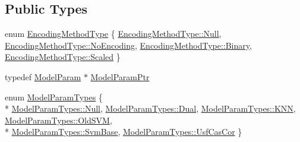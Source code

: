 \subsection*{Public Types}
\begin{DoxyCompactItemize}
\item 
enum \hyperlink{class_k_k_m_l_l_1_1_model_param_a09e49f936f411dba6f08bdaf8d6b4a98}{Encoding\+Method\+Type} \{ \hyperlink{class_k_k_m_l_l_1_1_model_param_a09e49f936f411dba6f08bdaf8d6b4a98abbb93ef26e3c101ff11cdd21cab08a94}{Encoding\+Method\+Type\+::\+Null}, 
\hyperlink{class_k_k_m_l_l_1_1_model_param_a09e49f936f411dba6f08bdaf8d6b4a98a3f6e102acead54bbbf4c704dd88fb94b}{Encoding\+Method\+Type\+::\+No\+Encoding}, 
\hyperlink{class_k_k_m_l_l_1_1_model_param_a09e49f936f411dba6f08bdaf8d6b4a98a6ce976e8f061b2b5cfe4d0c50c3405dd}{Encoding\+Method\+Type\+::\+Binary}, 
\hyperlink{class_k_k_m_l_l_1_1_model_param_a09e49f936f411dba6f08bdaf8d6b4a98a7380ae6c5e1189eef50cfd0557d74e99}{Encoding\+Method\+Type\+::\+Scaled}
 \}
\item 
typedef \hyperlink{class_k_k_m_l_l_1_1_model_param}{Model\+Param} $\ast$ \hyperlink{class_k_k_m_l_l_1_1_model_param_a9207769b1dd342da66939ceffa4324cf}{Model\+Param\+Ptr}
\item 
enum \hyperlink{class_k_k_m_l_l_1_1_model_param_a5984a5fe225fdbe8e40fb5ec746a42d0}{Model\+Param\+Types} \{ \\*
\hyperlink{class_k_k_m_l_l_1_1_model_param_a5984a5fe225fdbe8e40fb5ec746a42d0abbb93ef26e3c101ff11cdd21cab08a94}{Model\+Param\+Types\+::\+Null}, 
\hyperlink{class_k_k_m_l_l_1_1_model_param_a5984a5fe225fdbe8e40fb5ec746a42d0acf53591af1208ddd535806600273099a}{Model\+Param\+Types\+::\+Dual}, 
\hyperlink{class_k_k_m_l_l_1_1_model_param_a5984a5fe225fdbe8e40fb5ec746a42d0ab602e23c0ec2466f3aa6cade0cd5ce05}{Model\+Param\+Types\+::\+K\+NN}, 
\hyperlink{class_k_k_m_l_l_1_1_model_param_a5984a5fe225fdbe8e40fb5ec746a42d0a7a3ee72cc2709227d58fd2c189a2a58b}{Model\+Param\+Types\+::\+Old\+S\+VM}, 
\\*
\hyperlink{class_k_k_m_l_l_1_1_model_param_a5984a5fe225fdbe8e40fb5ec746a42d0ac59ef2743d310cad5d7bbb7b53773bb4}{Model\+Param\+Types\+::\+Svm\+Base}, 
\hyperlink{class_k_k_m_l_l_1_1_model_param_a5984a5fe225fdbe8e40fb5ec746a42d0ade699dc1790347a08d7060ab8078c71c}{Model\+Param\+Types\+::\+Usf\+Cas\+Cor}
 \}
\end{DoxyCompactItemize}
